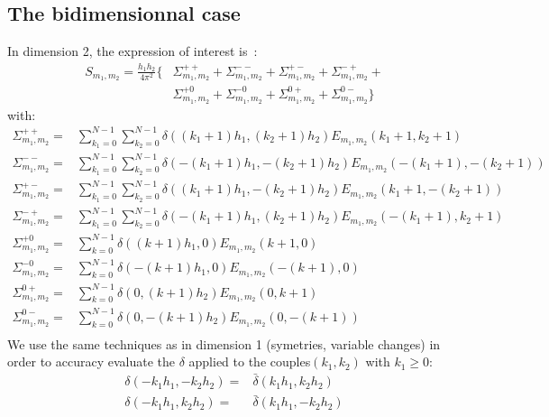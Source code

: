 \subsection{The bidimensionnal case}
In dimension 2, the expression of interest is~:
\begin{align}
S_{m_1,m_2}=\frac{h_1h_2}{4\pi^2}\Big\{&\Sigma_{m_1,m_2}^{++} + \Sigma_{m_1,m_2}^{--} + \Sigma_{m_1,m_2}^{+-} + \Sigma_{m_1,m_2}^{-+}+\nonumber\\
  &\Sigma_{m_1,m_2}^{+0}+\Sigma_{m_1,m_2}^{-0}+\Sigma_{m_1,m_2}^{0+}+\Sigma_{m_1,m_2}^{0-}\Big\}
\end{align}
with:
\begin{align}
\Sigma_{m_1,m_2}^{++}=&\sum_{k_1=0}^{N-1}\sum_{k_2=0}^{N-1}\delta\left((k_1+1)h_1,(k_2+1)h_2\right)E_{m_1,m_2}(k_1+1,k_2+1)\\
\Sigma_{m_1,m_2}^{--}=&\sum_{k_1=0}^{N-1}\sum_{k_2=0}^{N-1}\delta\left(-(k_1+1)h_1,-(k_2+1)h_2\right)E_{m_1,m_2}(-(k_1+1),-(k_2+1))\\
\Sigma_{m_1,m_2}^{+-}=&\sum_{k_1=0}^{N-1}\sum_{k_2=0}^{N-1}\delta\left((k_1+1)h_1,-(k_2+1)h_2\right)E_{m_1,m_2}(k_1+1,-(k_2+1))\\
\Sigma_{m_1,m_2}^{-+}=&\sum_{k_1=0}^{N-1}\sum_{k_2=0}^{N-1}\delta\left(-(k_1+1)h_1,(k_2+1)h_2\right)E_{m_1,m_2}(-(k_1+1),k_2+1)\\
\Sigma_{m_1,m_2}^{+0}=&\sum_{k=0}^{N-1}\delta((k+1)h_1,0)E_{m_1,m_2}(k+1,0)\\
\Sigma_{m_1,m_2}^{-0}=&\sum_{k=0}^{N-1}\delta(-(k+1)h_1,0)E_{m_1,m_2}(-(k+1),0)\\
\Sigma_{m_1,m_2}^{0+}=&\sum_{k=0}^{N-1}\delta(0,(k+1)h_2)E_{m_1,m_2}(0,k+1)\\
\Sigma_{m_1,m_2}^{0-}=&\sum_{k=0}^{N-1}\delta(0,-(k+1)h_2)E_{m_1,m_2}(0,-(k+1))\\
\end{align}
We use the same techniques as in dimension 1 (symetries, variable changes) in order to accuracy evaluate the $\delta$ applied to the couples$(k_1, k_2)$ with $k_1\geq 0$:
\begin{align}
\delta\left(-k_1h_1,-k_2h_2\right)=&\bar{\delta}\left(k_1h_1,k_2h_2\right)\\
\delta\left(-k_1h_1, k_2h_2\right)=&\bar{\delta}\left(k_1h_1,-k_2h_2\right)\\
\end{align}

